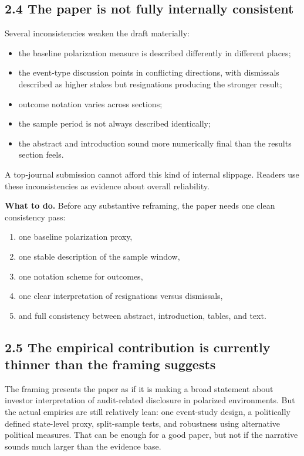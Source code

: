 \subsection*{2.4 The paper is not fully internally consistent}

Several inconsistencies weaken the draft materially:
\begin{itemize}[leftmargin=1.5em]
    \item the baseline polarization measure is described differently in different places;
    \item the event-type discussion points in conflicting directions, with dismissals described as higher stakes but resignations producing the stronger result;
    \item outcome notation varies across sections;
    \item the sample period is not always described identically;
    \item the abstract and introduction sound more numerically final than the results section feels.
\end{itemize}

A top-journal submission cannot afford this kind of internal slippage. Readers use these inconsistencies as evidence about overall reliability.

\textbf{What to do.} Before any substantive reframing, the paper needs one clean consistency pass:
\begin{enumerate}[leftmargin=1.5em]
    \item one baseline polarization proxy,
    \item one stable description of the sample window,
    \item one notation scheme for outcomes,
    \item one clear interpretation of resignations versus dismissals,
    \item and full consistency between abstract, introduction, tables, and text.
\end{enumerate}

\subsection*{2.5 The empirical contribution is currently thinner than the framing suggests}

The framing presents the paper as if it is making a broad statement about investor interpretation of audit-related disclosure in polarized environments. But the actual empirics are still relatively lean: one event-study design, a politically defined state-level proxy, split-sample tests, and robustness using alternative political measures. That can be enough for a good paper, but not if the narrative sounds much larger than the evidence base.

